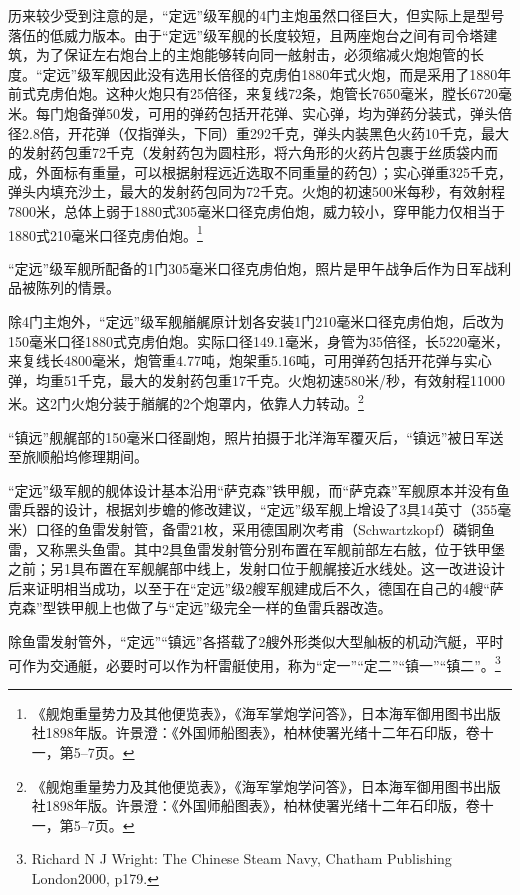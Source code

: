 \documentclass[12pt,UTF8]{ctexbook}
\begin{document}
历来较少受到注意的是，“定远”级军舰的4门主炮虽然口径巨大，但实际上是型号落伍的低威力版本。由于“定远”级军舰的长度较短，且两座炮台之间有司令塔建筑，为了保证左右炮台上的主炮能够转向同一舷射击，必须缩减火炮炮管的长度。“定远”级军舰因此没有选用长倍径的克虏伯1880年式火炮，而是采用了1880年前式克虏伯炮。这种火炮只有25倍径，来复线72条，炮管长7650毫米，膛长6720毫米。每门炮备弹50发，可用的弹药包括开花弹、实心弹，均为弹药分装式，弹头倍径2.8倍，开花弹（仅指弹头，下同）重292千克，弹头内装黑色火药10千克，最大的发射药包重72千克（发射药包为圆柱形，将六角形的火药片包裹于丝质袋内而成，外面标有重量，可以根据射程远近选取不同重量的药包）；实心弹重325千克，弹头内填充沙土，最大的发射药包同为72千克。火炮的初速500米每秒，有效射程7800米，总体上弱于1880式305毫米口径克虏伯炮，威力较小，穿甲能力仅相当于1880式210毫米口径克虏伯炮。\footnote{《舰炮重量势力及其他便览表》，《海军掌炮学问答》，日本海军御用图书出版社1898年版。许景澄：《外国师船图表》，柏林使署光绪十二年石印版，卷十一，第5--7页。}

“定远”级军舰所配备的1门305毫米口径克虏伯炮，照片是甲午战争后作为日军战利品被陈列的情景。

除4门主炮外，“定远”级军舰艏艉原计划各安装1门210毫米口径克虏伯炮，后改为150毫米口径1880式克虏伯炮。实际口径149.1毫米，身管为35倍径，长5220毫米，来复线长4800毫米，炮管重4.77吨，炮架重5.16吨，可用弹药包括开花弹与实心弹，均重51千克，最大的发射药包重17千克。火炮初速580米/秒，有效射程11000米。这2门火炮分装于艏艉的2个炮罩内，依靠人力转动。\footnote{《舰炮重量势力及其他便览表》，《海军掌炮学问答》，日本海军御用图书出版社1898年版。许景澄：《外国师船图表》，柏林使署光绪十二年石印版，卷十一，第5--7页。}

“镇远”舰艉部的150毫米口径副炮，照片拍摄于北洋海军覆灭后，“镇远”被日军送至旅顺船坞修理期间。

“定远”级军舰的舰体设计基本沿用“萨克森”铁甲舰，而“萨克森”军舰原本并没有鱼雷兵器的设计，根据刘步蟾的修改建议，“定远”级军舰上增设了3具14英寸（355毫米）口径的鱼雷发射管，备雷21枚，采用德国刷次考甫（Schwartzkopf）磷铜鱼雷，又称黑头鱼雷。其中2具鱼雷发射管分别布置在军舰前部左右舷，位于铁甲堡之前；另1具布置在军舰艉部中线上，发射口位于舰艉接近水线处。这一改进设计后来证明相当成功，以至于在“定远”级2艘军舰建成后不久，德国在自己的4艘“萨克森”型铁甲舰上也做了与“定远”级完全一样的鱼雷兵器改造。

除鱼雷发射管外，“定远”“镇远”各搭载了2艘外形类似大型舢板的机动汽艇，平时可作为交通艇，必要时可以作为杆雷艇使用，称为“定一”“定二”“镇一”“镇二”。\footnote{Richard N J Wright: The Chinese Steam Navy, Chatham Publishing London2000, p179.}
\end{document}
